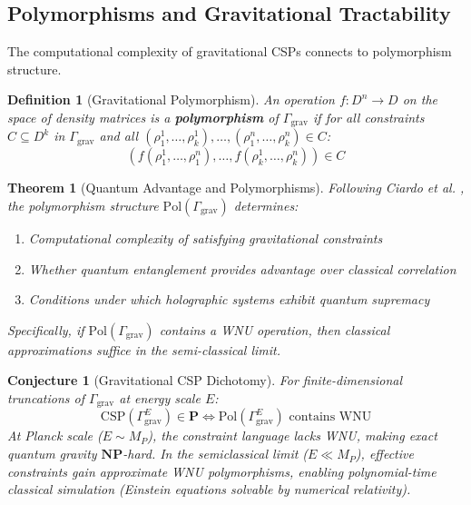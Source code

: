 \documentclass[11pt,a4paper]{article}
\newtheorem{theorem}{Theorem}[section]
\newtheorem{definition}{Definition}[section]
\newtheorem{conjecture}{Conjecture}[section]
\theoremstyle{remark}
\theoremstyle{definition}
\begin{document}
\subsection{Polymorphisms and Gravitational Tractability}

The computational complexity of gravitational CSPs connects to polymorphism structure.

\begin{definition}[Gravitational Polymorphism]
An operation $f: D^n \to D$ on the space of density matrices is a \textbf{polymorphism} of $\Gamma_{\text{grav}}$ if for all constraints $C \subseteq D^k$ in $\Gamma_{\text{grav}}$ and all $(\rho_1^1, \ldots, \rho_k^1), \ldots, (\rho_1^n, \ldots, \rho_k^n) \in C$:
\begin{equation}
\left(f(\rho_1^1, \ldots, \rho_1^n), \ldots, f(\rho_k^1, \ldots, \rho_k^n)\right) \in C
\end{equation}
\end{definition}

\begin{theorem}[Quantum Advantage and Polymorphisms]
\label{thm:quantum_advantage_polymorphisms}
Following Ciardo et al. \cite{Ciardo2024}, the polymorphism structure $\text{Pol}(\Gamma_{\text{grav}})$ determines:
\begin{enumerate}[label=(\roman*)]
\item Computational complexity of satisfying gravitational constraints
\item Whether quantum entanglement provides advantage over classical correlation
\item Conditions under which holographic systems exhibit quantum supremacy
\end{enumerate}
Specifically, if $\text{Pol}(\Gamma_{\text{grav}})$ contains a WNU operation, then classical approximations suffice in the semi-classical limit.
\end{theorem}

\begin{conjecture}[Gravitational CSP Dichotomy]
\label{conj:grav_dichotomy}
For finite-dimensional truncations of $\Gamma_{\text{grav}}$ at energy scale $E$:
\begin{equation}
\text{CSP}(\Gamma_{\text{grav}}^E) \in \mathbf{P} \iff \text{Pol}(\Gamma_{\text{grav}}^E) \text{ contains WNU}
\end{equation}
At Planck scale ($E \sim M_P$), the constraint language lacks WNU, making exact quantum gravity $\mathbf{NP}$-hard. In the semiclassical limit ($E \ll M_P$), effective constraints gain approximate WNU polymorphisms, enabling polynomial-time classical simulation (Einstein equations solvable by numerical relativity).
\end{conjecture}
\end{document}
